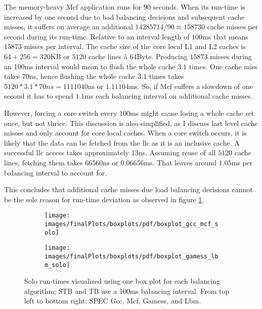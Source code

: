 The memory-heavy Mcf application runs for $90$ seconds.
When its run-time is increased by one second due to bad balancing decisions and
subsequent cache misses, it suffers on average an additional
$14285714 / 90 \approx 158730$ cache misses per second during its run-time.
Relative to an interval length of $100$ms that means $15873$ misses per interval.
The cache size of the core local L1 and L2 caches is $64 + 256 = 320$KB or
$5120$ cache lines \`a $64$Byte.
Producing $15873$ misses during an 100ms interval would mean to flush the
whole cache $3.1$ times.
One cache miss takes $70$ns, hence flushing the whole cache $3.1$ times takes
$5120 * 3.1 * 70ns = 1111040$ns or $1.11104$ms.
So, if Mcf suffers a slowdown of one second it has to spend $1.1$ms each balancing
interval on additional cache misses.

However, forcing a core switch every $100$ms might cause losing a whole cache set
once, but not thrice.
This discussion is also simplified, as I discuss last level cache misses
and only account for core local caches.
When a core switch occurs, it is likely that the data can be fetched from the
\gls{llc} as it is an inclusive cache.
A successful \gls{llc} access takes approximately $13$ns.
Assuming reuse of all $5120$ cache lines, fetching them takes $66560$ns or
$0.06656$ms.
That leaves around $1.05$ms per balancing interval to account for.

This concludes that additional cache misses due load balancing decisions cannot
be the sole reason for run-time deviation as observed in figure
\ref{eval:fig:box_solo}.

\begin{figure}[!ht]
  \begin{subfigure}{\textwidth}
  \texttt{[image: images/finalPlots/boxplots/pdf/boxplot\_gcc\_mcf\_solo]}
  \end{subfigure}
  \begin{subfigure}{\textwidth}
  \texttt{[image: images/finalPlots/boxplots/pdf/boxplot\_gamess\_lbm\_solo]}
  \end{subfigure}
  \caption{Solo run-times visualized using one box plot for each balancing
    algorithm; STB and TB use a 100ms balancing interval.
    From top left to bottom right: SPEC Gcc, Mcf, Gamess, and Lbm.}
  \label{eval:fig:box_solo}
\end{figure}

